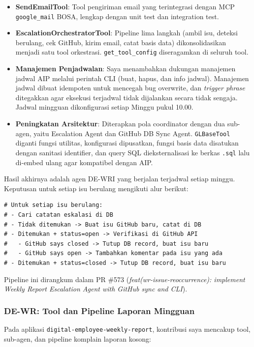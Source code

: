 \begin{itemize}
    \item \textbf{SendEmailTool}: Tool pengiriman email yang terintegrasi dengan MCP \texttt{google\_mail} BOSA, lengkap dengan unit test dan integration test.
    \item \textbf{EscalationOrchestratorTool}: Pipeline lima langkah (ambil isu, deteksi berulang, cek GitHub, kirim email, catat basis data) dikonsolidasikan menjadi satu tool orkestrasi. \texttt{get\_tool\_config} diseragamkan di seluruh tool.
    \item \textbf{Manajemen Penjadwalan}: Saya menambahkan dukungan manajemen jadwal AIP melalui perintah CLI (buat, hapus, dan info jadwal). Manajemen jadwal dibuat idempoten untuk mencegah bug overwrite, dan \textit{trigger phrase} ditegakkan agar eksekusi terjadwal tidak dijalankan secara tidak sengaja. Jadwal mingguan dikonfigurasi setiap Minggu pukul 10.00.
    \item \textbf{Peningkatan Arsitektur}: Diterapkan pola coordinator dengan dua sub-agen, yaitu Escalation Agent dan GitHub DB Sync Agent. \texttt{GLBaseTool} diganti fungsi utilitas, konfigurasi dipusatkan, fungsi basis data disatukan dengan sanitasi identifier, dan query SQL dieksternalisasi ke berkas \texttt{.sql} lalu di-embed ulang agar kompatibel dengan AIP.
\end{itemize}

Hasil akhirnya adalah agen DE-WRI yang berjalan terjadwal setiap minggu. Keputusan untuk setiap isu berulang mengikuti alur berikut:

\begin{lstlisting}[caption={Decision tree untuk isu berulang}]
# Untuk setiap isu berulang:
# - Cari catatan eskalasi di DB
# - Tidak ditemukan -> Buat isu GitHub baru, catat di DB
# - Ditemukan + status=open -> Verifikasi di GitHub API
#   - GitHub says closed -> Tutup DB record, buat isu baru
#   - GitHub says open -> Tambahkan komentar pada isu yang ada
# - Ditemukan + status=closed -> Tutup DB record, buat isu baru
\end{lstlisting}

Pipeline ini dirangkum dalam PR \#573 (\textit{feat(wr-issue-reoccurrence): implement Weekly Report Escalation Agent with GitHub sync and CLI}).

\subsubsection{DE-WR: Tool dan Pipeline Laporan Mingguan}

Pada aplikasi \texttt{digital-employee-weekly-report}, kontribusi saya mencakup tool, sub-agen, dan pipeline komplain laporan kosong:

